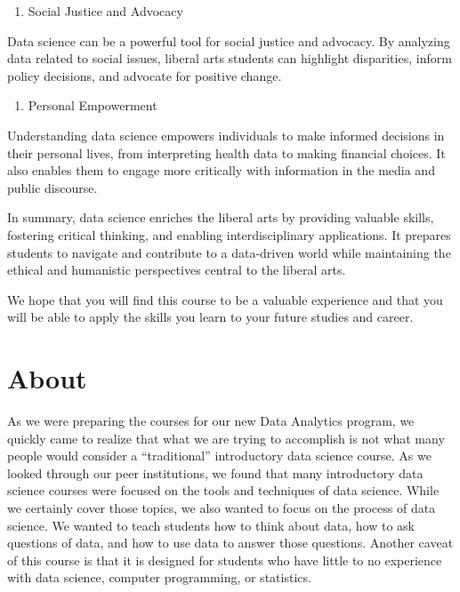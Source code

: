 \documentclass[
  letterpaper,
  DIV=11,
  numbers=noendperiod]{scrreprt}
\providecommand{\tightlist}{%
  \setlength{\itemsep}{0pt}\setlength{\parskip}{0pt}}\usepackage{longtable,booktabs,array}
\begin{document}
\begin{enumerate}
\def\labelenumi{\arabic{enumi}.}
\setcounter{enumi}{8}
\tightlist
\item
  Social Justice and Advocacy
\end{enumerate}

Data science can be a powerful tool for social justice and advocacy. By
analyzing data related to social issues, liberal arts students can
highlight disparities, inform policy decisions, and advocate for
positive change.

\begin{enumerate}
\def\labelenumi{\arabic{enumi}.}
\setcounter{enumi}{9}
\tightlist
\item
  Personal Empowerment
\end{enumerate}

Understanding data science empowers individuals to make informed
decisions in their personal lives, from interpreting health data to
making financial choices. It also enables them to engage more critically
with information in the media and public discourse.

In summary, data science enriches the liberal arts by providing valuable
skills, fostering critical thinking, and enabling interdisciplinary
applications. It prepares students to navigate and contribute to a
data-driven world while maintaining the ethical and humanistic
perspectives central to the liberal arts.

We hope that you will find this course to be a valuable experience and
that you will be able to apply the skills you learn to your future
studies and career.


\chapter*{About}\label{about}


As we were preparing the courses for our new Data Analytics program, we
quickly came to realize that what we are trying to accomplish is not
what many people would consider a ``traditional'' introductory data
science course. As we looked through our peer institutions, we found
that many introductory data science courses were focused on the tools
and techniques of data science. While we certainly cover those topics,
we also wanted to focus on the process of data science. We wanted to
teach students how to think about data, how to ask questions of data,
and how to use data to answer those questions. Another caveat of this
course is that it is designed for students who have little to no
experience with data science, computer programming, or statistics.
\end{document}
